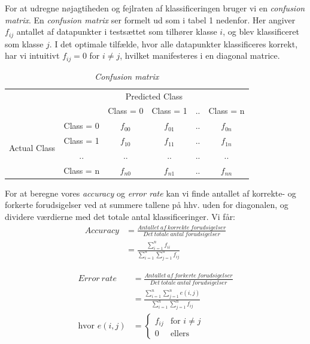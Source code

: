\documentclass{article}
\begin{document}
For at udregne nøjagtiheden og fejlraten af klassificeringen bruger vi en \textit{confusion matrix}. En \textit{confusion matrix} ser formelt ud som i tabel 1 nedenfor. Her angiver $f_{ij}$ antallet af datapunkter i testsættet som tilhører klasse $i$, og blev klassificeret som klasse $j$. I det optimale tilfælde, hvor alle datapunkter klassificeres korrekt, har vi intuitivt $f_{ij}=0$ for $i\neq j$, hvilket manifesteres i en diagonal matrice.\\

\begin{table}[H]
\begin{center}
\begin{tabular}{cc|c|c|c|c|}
    & \multicolumn{5}{c}{Predicted Class} \\
    \cline{3-6}
     & & Class = 0 & Class = 1 & .. & Class = n \\
    \cline{2-6}
    \multicolumn{1}{c|}{\multirow{4}{*}{Actual Class}} & Class = 0 & $f_{00}$ & $f_{01}$ & .. & $f_{0n}$ \\
    \cline{2-6}
    \multicolumn{1}{c|}{} & Class = 1 & $f_{10}$ & $f_{11}$ & .. & $f_{1n}$ \\
    \cline{2-6}
    \multicolumn{1}{c|}{} & .. & .. & .. & .. & .. \\
    \cline{2-6}
    \multicolumn{1}{c|}{} & Class = n & $f_{n0}$ & $f_{n1}$ & .. & $f_{nn}$ \\
    \cline{2-6}
\end{tabular}
\caption{\textit{Confusion matrix}}
\end{center}
\end{table}

For at beregne vores \textit{accuracy} og \textit{error rate} kan vi finde antallet af korrekte- og forkerte forudsigelser ved at summere tallene på hhv. uden for diagonalen, og dividere værdierne med det totale antal klassificeringer. Vi får:\\

\begin{align*}
Accuracy &= \frac{Antallet \ af \ korrekte \ forudsigelser}{Det \ totale \ antal \ forudsigelser} \\
         &= \frac{\sum_{i=1}^{n}f_{ii}}{\sum_{i=1}^{n}\sum_{j=1}^{n}f_{ij}}
\end{align*}

\begin{align*}
Error \ rate &= \frac{Antallet \ af \ forkerte \ forudsigelser}{Det \ totale \ antal \ forudsigelser} \\
           &= \frac{\sum_{i=1}^{n}\sum_{j=1}^{n}e(i,j)}{\sum_{i=1}^{n}\sum_{j=1}^{n}f_{ij}}\\
           \text{hvor }e(i,j)&=
           \begin{cases} f_{ij} & \text{for } i\neq j \\
           0                                    & \text{ellers}      %
           \end{cases}
\end{align*}
\end{document}
